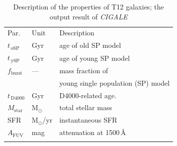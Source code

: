     \begin{table}
\caption[]{Description of the properties of T12 galaxies; the output result of {\em CIGALE}}     
\label{tab: props}
\centering
\begin{tabular}{l l l}
\hline\hline
\noalign{\smallskip}
Par. & Unit & Description\\
\noalign{\smallskip}
\hline
\noalign{\smallskip}
$t_{\,\mathrm{oSP}}$ & Gyr & age of old SP model \\
$t_{\,\mathrm{ySP}}$ & Gyr & age of young SP model \\
$f_\mathrm{burst}$ & --- & mass fraction of \\
& & young single population (SP) model \\
\noalign{\smallskip}
$t_{\,\mathrm{D4000}}$ & Gyr & D4000-related age. \\
\noalign{\smallskip}
$M_\mathrm{star}$ & M$_\odot$ & total stellar mass  \\
SFR & M$_\odot$/yr & instantaneous SFR  \\
$A_\mathrm{FUV}$ & mag & attenuation at 1500\,\AA{} \\
\noalign{\smallskip}
\hline
\end{tabular}
\end{table}
